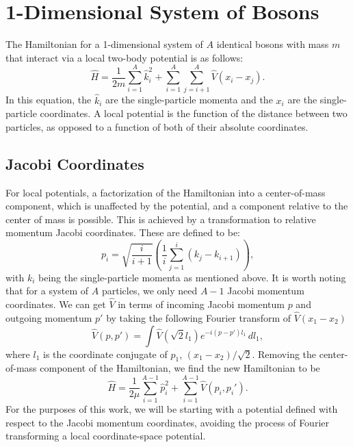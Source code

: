 \section{1-Dimensional System of Bosons}

The Hamiltonian for a 1-dimensional system of $A$ identical bosons with mass $m$ that interact via a local two-body potential is as follows:
\begin{equation}
\hat{H} = \frac{1}{2 m} \sum_{i=1}^A \hat{k}_i^2 + \sum_{i=1}^A\sum_{j=i+1}^{A} \hat{V}(x_i - x_j).
\end{equation}
In this equation, the $\hat{k}_i$ are the single-particle momenta and the $x_i$ are the single-particle coordinates. A local potential is the function of the distance between two particles, as opposed to a function of both of their absolute coordinates.

\subsection{Jacobi Coordinates}

For local potentials, a factorization of the Hamiltonian into a center-of-mass component, which is unaffected by the potential, and a component relative to the center of mass is possible. This is achieved by a transformation to relative momentum Jacobi coordinates. These are defined to be:
\begin{equation}
p_i = \sqrt{\frac{i}{i+1}} \left(\frac{1}{i} \sum_{j=1}^{i}(k_j - k_{i+1})\right),
\end{equation}
with $k_i$ being the single-particle momenta as mentioned above. It is worth noting that for a system of $A$ particles, we only need $A-1$ Jacobi momentum coordinates. We can get $\hat{V}$ in terms of incoming Jacobi momentum $p$ and outgoing momentum $p'$ by taking the following Fourier transform of $\hat{V}(x_1 - x_2)$
\begin{equation}
\hat{V}(p, p') = \int \hat{V}(\sqrt{2} l_1) e^{- i (p - p') l_1} \,dl_1,
\end{equation}
where $l_1$ is the coordinate conjugate of $p_1$, $(x_1 - x_2)/\sqrt{2}$. Removing the center-of-mass component of the Hamiltonian, we find the new Hamiltonian to be
\begin{equation}
\hat{H} = \frac{1}{2 \mu} \sum_{i=1}^{A-1} \hat{p}_i^2 + \sum_{i=1}^{A-1}\hat{V}(p_i, p_i').
\end{equation}
For the purposes of this work, we will be starting with a potential defined with respect to the Jacobi momentum coordinates, avoiding the process of Fourier transforming a local coordinate-space potential.

